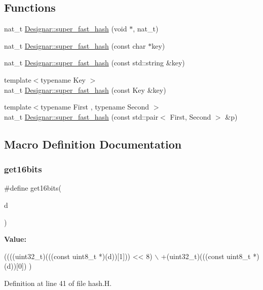 \subsection*{Functions}
\begin{DoxyCompactItemize}
\item 
nat\+\_\+t \hyperlink{namespace_designar_afd5712d16b3ae1c1c7d59f1004cd96fd}{Designar\+::super\+\_\+fast\+\_\+hash} (void $\ast$, nat\+\_\+t)
\item 
nat\+\_\+t \hyperlink{namespace_designar_a090aac15e358ba6f7db1b58d1fed363f}{Designar\+::super\+\_\+fast\+\_\+hash} (const char $\ast$key)
\item 
nat\+\_\+t \hyperlink{namespace_designar_a289dc254d6e2caad30367f337eb6a04e}{Designar\+::super\+\_\+fast\+\_\+hash} (const std\+::string \&key)
\item 
{\footnotesize template$<$typename Key $>$ }\\nat\+\_\+t \hyperlink{namespace_designar_a1996522f2f70bdf5dc5659a5a0e42c86}{Designar\+::super\+\_\+fast\+\_\+hash} (const Key \&key)
\item 
{\footnotesize template$<$typename First , typename Second $>$ }\\nat\+\_\+t \hyperlink{namespace_designar_af31e2906f9449591dfe3b6380768ad44}{Designar\+::super\+\_\+fast\+\_\+hash} (const std\+::pair$<$ First, Second $>$ \&p)
\end{DoxyCompactItemize}


\subsection{Macro Definition Documentation}
\mbox{\label{hash_8_h_abc7d71657be8975a51684e41029b7964}} 
\subsubsection{\texorpdfstring{get16bits}{get16bits}}
{\footnotesize\ttfamily \#define get16bits(\begin{DoxyParamCaption}\item[{}]{d }\end{DoxyParamCaption})}

{\bfseries Value\+:}
\begin{DoxyCode}
((((uint32\_t)(((\textcolor{keyword}{const} uint8\_t *)(d))[1])) << 8) \(\backslash\)
              +(uint32\_t)(((\textcolor{keyword}{const} uint8\_t *)(d))[0]) )
\end{DoxyCode}


Definition at line 41 of file hash.\+H.

